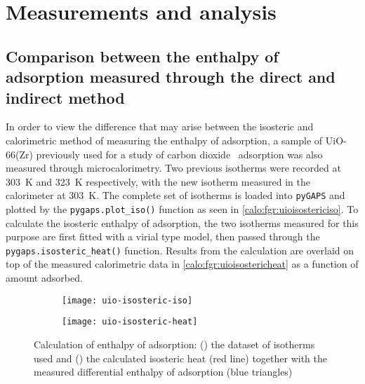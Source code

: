 
\section{Measurements and analysis}

\subsection{Comparison between the enthalpy of adsorption measured
	through the direct and indirect method}

In order to view the difference that may arise between the isosteric 
and calorimetric method of measuring the enthalpy of adsorption, 
a sample of UiO-66(Zr) previously used for a study of 
carbon dioxide~\cite{wiersumEvaluationUiO66GasBased2011} adsorption
was also measured through microcalorimetry.
Two previous isotherms were recorded at \SI{303}{\kelvin} and
\SI{323}{\kelvin} respectively, with the new isotherm measured in the 
calorimeter at \SI{303}{\kelvin}. The complete set of isotherms is
loaded into \texttt{pyGAPS} and plotted by the \lstinline{pygaps.plot_iso()}
function as seen in \autoref{calo:fgr:uioisostericiso}.
To calculate the isosteric enthalpy of adsorption, the two isotherms
measured for this purpose are first fitted with a virial type model,
then passed through the \lstinline{pygaps.isosteric_heat()} function.
Results from the calculation are overlaid on top of the measured
calorimetric data in \autoref{calo:fgr:uioisostericheat} as a function
of amount adsorbed.

\begin{figure}[htb]
	\centering

	\begin{subfigure}[b]{.5\textwidth}
		\centering
		\texttt{[image: uio-isosteric-iso]}
		\caption{}%
		\label{calo:fgr:uioisostericiso}
	\end{subfigure}%
	\begin{subfigure}[b]{.5\textwidth}
		\centering
		\texttt{[image: uio-isosteric-heat]}
		\caption{}%
		\label{calo:fgr:uioisostericheat}
	\end{subfigure}
	\caption{Calculation of enthalpy of adsorption:
		(\protect{})
		the dataset of isotherms used and
		(\protect{}) the calculated
		isosteric heat (red line) together with the measured
		differential enthalpy of adsorption (blue triangles)}%
	\label{calo:fgr:uioisosteric}

\end{figure}

